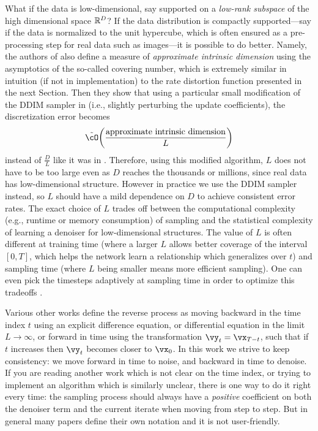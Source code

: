 \documentclass[../../book-main.tex]{subfiles}
\begin{document}
\begin{remark}
	What if the data is low-dimensional, say supported on a \textit{low-rank subspace} of the high dimensional space \(\mathbb{R}^{D}\)? If the data distribution is compactly supported---say if the data is normalized to the unit hypercube, which is often ensured as a pre-processing step for real data such as images---it is possible to do better. Namely, the authors of \cite{li2024d} also define a measure of \textit{approximate intrinsic dimension} using the asymptotics of the so-called covering number, which is extremely similar in intuition (if not in implementation) to the rate distortion function presented in the next Section. Then they show that using a particular small modification of the DDIM sampler in  (i.e., slightly perturbing the update coefficients), the discretization error becomes
	\begin{equation}
		\tilde{\cO}\rp{\frac{\text{approximate intrinsic dimension}}{L}}
	\end{equation}
	instead of \(\frac{D}{L}\) like it was in . Therefore, using this modified algorithm, \(L\) does not have to be too large even as \(D\) reaches the thousands or millions, since real data has low-dimensional structure. However in practice we use the DDIM sampler instead, so \(L\) should have a mild dependence on \(D\) to achieve consistent error rates. The exact choice of \(L\) trades off between the computational complexity (e.g., runtime or memory consumption) of sampling and the statistical complexity of learning a denoiser for low-dimensional structures. The value of \(L\) is often different at training time (where a larger \(L\) allows better coverage of the interval \([0, T]\), which helps the network learn a relationship which generalizes over \(t\)) and sampling time (where \(L\) being smaller means more efficient sampling). One can even pick the timesteps adaptively at sampling time in order to optimize this tradeoffs \cite{bao2022analytic}.
\end{remark}

\begin{remark}
	Various other works define the reverse process as moving backward in the time index \(t\) using an explicit difference equation, or differential equation in the limit \(L \to \infty\), or forward in time using the transformation \(\vy_{t} = \vx_{T - t}\), such that if \(t\) increases then \(\vy_{t}\) becomes closer to \(\vx_{0}\). In this work we strive to keep consistency: we move forward in time to noise, and backward in time to denoise. If you are reading another work which is not clear on the time index, or trying to implement an algorithm which is similarly unclear, there is one way to do it right every time: the sampling process should always have a \textit{positive} coefficient on both the denoiser term and the current iterate when moving from step to step. But in general many papers define their own notation and it is not user-friendly.
\end{remark}
\end{document}
